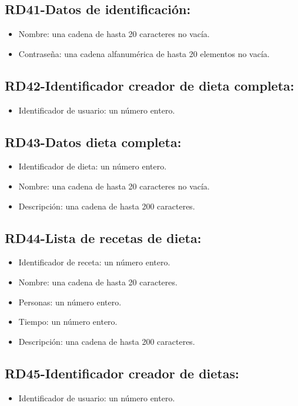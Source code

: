 \documentclass[a4paper,12pt]{report}
\begin{document}
\subsection{RD41-Datos de identificación:}
\label{sec-2-1-41}
\begin{itemize}
\item Nombre: una cadena de hasta 20 caracteres no vacía.
\item Contraseña: una cadena alfanumérica de hasta 20 elementos no vacía.
\end{itemize}
\subsection{RD42-Identificador creador de dieta completa:}
\label{sec-2-1-42}
\begin{itemize}
\item Identificador de usuario: un número entero.
\end{itemize}
\subsection{RD43-Datos dieta completa:}
\label{sec-2-1-43}
\begin{itemize}
\item Identificador de dieta: un número entero.
\item Nombre: una cadena de hasta 20 caracteres no vacía.
\item Descripción: una cadena de hasta 200 caracteres.
\end{itemize}
\subsection{RD44-Lista de recetas de dieta:}
\label{sec-2-1-44}
\begin{itemize}
\item Identificador de receta: un número entero.
\item Nombre: una cadena de hasta 20 caracteres.
\item Personas: un número entero.
\item Tiempo: un número entero.
\item Descripción: una cadena de hasta 200 caracteres.
\end{itemize}
\subsection{RD45-Identificador creador de dietas:}
\label{sec-2-1-45}
\begin{itemize}
\item Identificador de usuario: un número entero.
\end{itemize}
\end{document}
